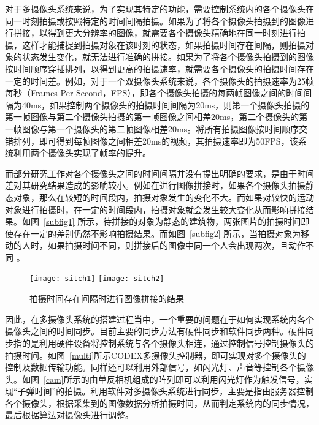 对于多摄像头系统来说，为了实现其特定的功能，需要控制系统内的各个摄像头在同一时刻拍摄或按照特定的时间间隔拍摄。如果为了将各个摄像头拍摄到的图像进行拼接，以得到更大分辨率的图像，就需要各个摄像头精确地在同一时刻进行拍摄，这样才能捕捉到拍摄对象在该时刻的状态，如果拍摄时间存在间隔，则拍摄对象的状态发生变化，就无法进行准确的拼接。如果为了将各个摄像头拍摄到的图像按时间顺序穿插排列，以得到更高的拍摄速率，就需要各个摄像头的拍摄时间存在一定的时间差。例如，对于一个双摄像头系统来说，各个摄像头的拍摄速率为25帧每秒（Frames Per Second，FPS），即各个摄像头拍摄的每两帧图像之间的时间间隔为40ms，如果控制两个摄像头的拍摄时间间隔为20ms，则第一个摄像头拍摄的第一帧图像与第二个摄像头拍摄的第一帧图像之间相差20ms，第二个摄像头的第一帧图像与第一个摄像头的第二帧图像相差20ms。将所有拍摄图像按时间顺序交错排列，即可得到每帧图像之间相差20ms的视频，其拍摄速率即为50FPS，该系统利用两个摄像头实现了帧率的提升。

而部分研究工作对各个摄像头之间的时间间隔并没有提出明确的要求，是由于时间差对其研究结果造成的影响较小。例如在进行图像拼接时，如果各个摄像头拍摄静态对象，那么在较短的时间段内，拍摄对象发生的变化不大。而如果对较快的运动对象进行拍摄时，在一定的时间段内，拍摄对象就会发生较大变化从而影响拼接结果。如图~\ref{subfig1} 所示，待拼接的对象为静态的建筑物，两张图片的拍摄时间即使存在一定的差别仍然不影响拍摄结果。而如图~\ref{subfig2} 所示，当拍摄对象为移动的人时，如果拍摄时间不同，则拼接后的图像中同一个人会出现两次，且动作不同 \cite{2}。

\begin{figure}[h]
  \centering%
    {\texttt{[image: sitch1]}}
    \hspace{4em}%
      {\texttt{[image: sitch2]}}
  \caption{拍摄时间存在间隔时进行图像拼接的结果}
  \label{sitch}
\end{figure}

因此，在多摄像头系统的搭建过程当中，一个重要的问题在于如何实现系统内各个摄像头之间的时间同步。目前主要的同步方法有硬件同步和软件同步两种。硬件同步指的是利用硬件设备将控制系统与各个摄像头相连，通过控制信号控制摄像头的拍摄时间。如图~\ref{multi}所示CODEX多摄像头控制器，即可实现对多个摄像头的控制及数据传输功能。同样还可以利用外部信号，如闪光灯、声音等控制各个摄像头。如图~\ref{cam}所示的由单反相机组成的阵列即可以利用闪光灯作为触发信号，实现“子弹时间”的拍摄。利用软件对多摄像头系统进行同步，主要是指由服务器控制各个摄像头，根据采集到的图像数据分析拍摄时间，从而判定系统内的同步情况，最后根据算法对摄像头进行调整。

